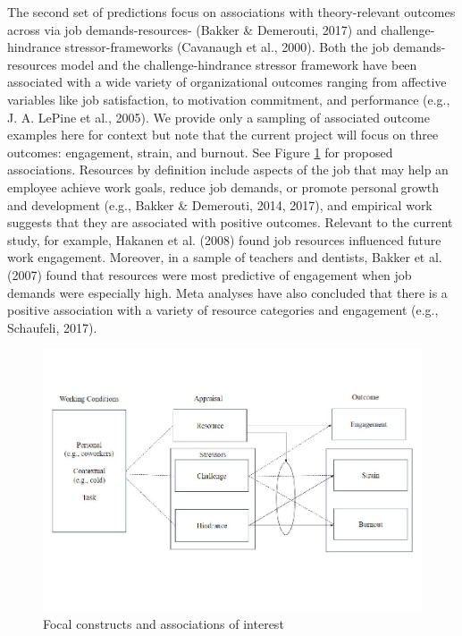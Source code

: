 \documentclass[
  man,mask]{apa7}
\begin{document}
The second set of predictions focus on associations with theory-relevant outcomes across via job demands-resources- (Bakker \& Demerouti, 2017) and challenge-hindrance stressor-frameworks (Cavanaugh et al., 2000). Both the job demands-resources model and the challenge-hindrance stressor framework have been associated with a wide variety of organizational outcomes ranging from affective variables like job satisfaction, to motivation commitment, and performance (e.g., J. A. LePine et al., 2005). We provide only a sampling of associated outcome examples here for context but note that the current project will focus on three outcomes: engagement, strain, and burnout. See Figure \ref{fig:ourmodel} for proposed associations. Resources by definition include aspects of the job that may help an employee achieve work goals, reduce job demands, or promote personal growth and development (e.g., Bakker \& Demerouti, 2014, 2017), and empirical work suggests that they are associated with positive outcomes. Relevant to the current study, for example, Hakanen et al. (2008) found job resources influenced future work engagement. Moreover, in a sample of teachers and dentists, Bakker et al. (2007) found that resources were most predictive of engagement when job demands were especially high. Meta analyses have also concluded that there is a positive association with a variety of resource categories and engagement (e.g., Schaufeli, 2017).

\begin{figure}
\centering
\includegraphics{Submission_files/figure-latex/ourmodel-1.pdf}
\caption{\label{fig:ourmodel}Focal constructs and associations of interest}
\end{figure}
\end{document}
